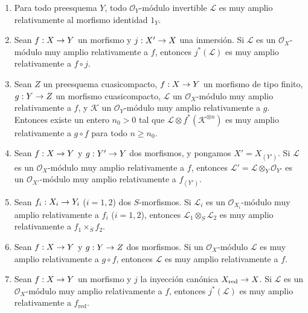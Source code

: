 \documentclass[oneside,10pt]{amsart}
\makeatletter
\renewcommand{\geq}{\geqslant}
\newcommand{\ega@arrow}[2]{\mathchoice{#1}{#2}{#2}{#2}}
\renewcommand{\to}{\ega@arrow{\longrightarrow}{\rightarrow}}
\let\EGAOriginalLabel\label
\renewcommand{\label}[1]{\phantomsection\EGAOriginalLabel{#1}}
\makeatother
\begin{document}
\begin{proposition}[4.4.10]
\label{II.4.4.10-fr}
\medskip\noindent
\begin{enumerate}
  \item[\rm{(i)}] Para todo preesquema $Y$, todo $\mathcal{O}_Y$-módulo invertible $\mathcal{L}$ es muy amplio relativamente al morfismo identidad $1_Y$.
  \item[\rm{(i \emph{bis})}] Sean $f:X\to Y$ un morfismo y $j:X'\to X$ una inmersión.
    Si $\mathcal{L}$ es un $\mathcal{O}_X$-módulo muy amplio relativamente a $f$, entonces $j^*(\mathcal{L})$ es muy amplio relativamente a $f\circ j$.
  \item[\rm{(ii)}] Sean $Z$ un preesquema cuasicompacto, $f:X\to Y$ un morfismo de tipo finito, $g:Y\to Z$ un morfismo cuasicompacto, $\mathcal{L}$ un $\mathcal{O}_X$-módulo muy amplio relativamente a $f$, y $\mathcal{K}$ un $\mathcal{O}_Y$-módulo muy amplio relativamente a $g$.
    Entonces existe un entero $n_0>0$ tal que $\mathcal{L}\otimes f^*(\mathcal{K}^{\otimes n})$ es muy amplio relativamente a $g\circ f$ para todo $n\geq n_0$.
  \item[\rm{(iii)}] Sean $f:X\to Y$ y $g:Y'\to Y$ dos morfismos, y pongamos $X'=X_{(Y')}$.
    Si $\mathcal{L}$ es un $\mathcal{O}_X$-módulo muy amplio relativamente a $f$, entonces $\mathcal{L}'=\mathcal{L}\otimes_Y\mathcal{O}_{Y'}$ es un $\mathcal{O}_{X'}$-módulo muy amplio relativamente a $f_{(Y')}$.
  \item[\rm{(iv)}] Sean $f_i:X_i\to Y_i$ ($i=1,2$) dos $S$-morfismos.
    Si $\mathcal{L}_i$ es un $\mathcal{O}_{X_i}$-módulo muy amplio relativamente a $f_i$ ($i=1,2$), entonces $\mathcal{L}_1\otimes_S\mathcal{L}_2$ es muy amplio relativamente a $f_1\times_Sf_2$.
  \item[\rm{(v)}] Sean $f:X\to Y$ y $g:Y\to Z$ dos morfismos.
    Si un $\mathcal{O}_X$-módulo $\mathcal{L}$ es muy amplio relativamente a $g\circ f$, entonces $\mathcal{L}$ es muy amplio relativamente a $f$.
  \item[\rm{(vi)}] Sean $f:X\to Y$ un morfismo y $j$ la inyección canónica $X_{\mathrm{red}}\to X$.
    Si $\mathcal{L}$ es un $\mathcal{O}_X$-módulo muy amplio relativamente a $f$, entonces $j^*(\mathcal{L})$ es muy amplio relativamente a $f_{\mathrm{red}}$.
\end{enumerate}
\end{proposition}
\end{document}
